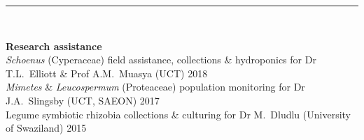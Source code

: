 \documentclass[10pt]{article}
\begin{document}
\hrule

\

\textbf{Research assistance} \\ %
\textit{Schoenus} (Cyperaceae)
  field assistance, collections \& hydroponics
  for Dr T.L.~Elliott \& Prof A.M.~Muasya
  {\small (UCT)}                                         \hfill {\small 2018} \\
\textit{Mimetes} \& \textit{Leucospermum} (Proteaceae)
  population monitoring
  for Dr J.A.~Slingsby
  {\small (UCT, SAEON)}                                  \hfill {\small 2017} \\
Legume symbiotic rhizobia
  collections \& culturing
  for Dr M.~Dludlu
  {\small (University of Swaziland)}                     \hfill {\small 2015} \\
\end{document}
